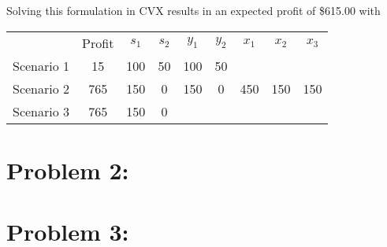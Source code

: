 \documentclass[a4paper]{article}
\begin{document}
Solving this formulation in CVX results in an expected profit of \$615.00 with

\begin{tabular}{c  c  c c  c c c c c}
           & Profit & $s_1$ & $s_2$ & $y_1$ & $y_2$ & $x_1$ & $x_2$ & $x_3$ \\
Scenario 1 &   15   & 100   & 50    & 100   & 50    &       &       &       \\
Scenario 2 &  765   & 150   & 0     & 150   & 0     & 450   & 150   & 150   \\
Scenario 3 &  765   & 150   & 0     &       &       &       &       &       \\
\end{tabular}

\section{Problem 2: }

\section{Problem 3: }
\end{document}
